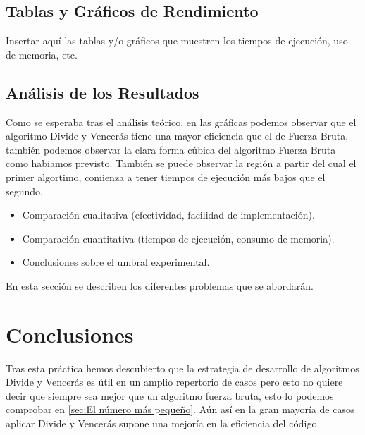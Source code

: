 \documentclass[a4paper,12pt]{article}
\begin{document}
\subsection{Tablas y Gráficos de Rendimiento}
Insertar aquí las tablas y/o gráficos que muestren los tiempos de ejecución,
uso de memoria, etc.

\subsection{Análisis de los Resultados}
Como se esperaba tras el análisis teórico, en las gráficas podemos observar que el algoritmo Divide y Vencerás 
tiene una mayor eficiencia que el de Fuerza Bruta, también podemos observar la clara forma cúbica del algoritmo
Fuerza Bruta como habiamos previsto. También se puede observar la región a partir del cual el primer algortimo, comienza 
a tener tiempos de ejecución más bajos que el segundo.
\begin{itemize}
	\item Comparación cualitativa (efectividad, facilidad de implementación).
	\item Comparación cuantitativa (tiempos de ejecución, consumo de memoria).
	\item Conclusiones sobre el umbral experimental.
\end{itemize}

En esta sección se describen los diferentes problemas que se abordarán.

\section{Conclusiones}
Tras esta práctica hemos descubierto que la estrategia de desarrollo de algoritmos Divide y Vencerás 
es útil en un amplio repertorio de casos pero esto no quiere decir que siempre sea mejor que un algoritmo 
fuerza bruta, esto lo podemos comprobar en \ref{sec:El número más pequeño}. Aún así en la gran mayoría de casos aplicar Divide y Vencerás 
supone una mejoría en la eficiencia del código.
\end{document}
